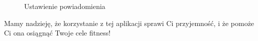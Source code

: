 \begin{figure}[!htb]
\begin{minipage}{.5\textwidth}
		\caption{Ustawienie powiadomienia}
		\label{rys:rysunek-r615}
	\end{minipage}
\end{figure}

Mamy nadzieję, że korzystanie z tej aplikacji sprawi Ci przyjemność, i że pomoże Ci ona osiągnąć Twoje cele fitness!


